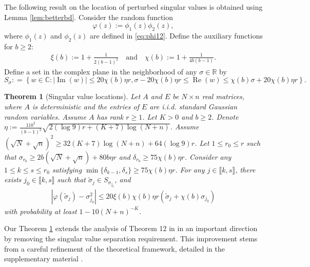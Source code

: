 \documentclass[reqno]{amsart}
\renewcommand\Re{\operatorname{Re}}
\renewcommand\Im{\operatorname{Im}}
\theoremstyle{plain}
\newtheorem{theorem}{Theorem}
\theoremstyle{definition}
\begin{document}
The following result on the location of perturbed singular values is obtained using Lemma \ref{lem:betterbd}. Consider the random function
\begin{equation} \label{eq:def:varphi}
	\varphi(z):=\phi_1(z)\phi_2(z),
\end{equation} 
where $\phi_1(z)$ and $\phi_2(z)$ are defined in \eqref{eq:phi12}. Define the auxiliary functions for $b\ge 2$:
\begin{align*}
\xi(b):= 1+ \frac{1}{2(b-1)^2}\quad \text{and} \quad \chi(b):= 1+ \frac{1}{4b(b-1)}.
\end{align*}
Define a set in the complex plane in the neighborhood of any $\sigma\in \mathbb R$ by
\begin{equation} \label{eq:resolventset}
	S_{\sigma} : = \left\{w \in \mathbb{C} : | \Im(w) | \leq 20 \chi(b) \eta r, \sigma - 20 \chi(b) \eta r \leq \Re(w) \leq \chi(b)\sigma +  20 \chi(b) \eta r \right\}.
\end{equation}

\begin{theorem}[Singular value locations] \label{thm:singularlocation}
Let $A$ and $E$ be $N \times n$ real matrices, where $A$ is deterministic and the entries of $E$ are i.i.d. standard Gaussian random variables. Assume $A$ has rank $r \geq 1$. Let $K>0$ and $b\ge 2$. Denote $\eta:= \frac{11b^2}{(b-1)^2} \sqrt{2(\log 9) r+(K+7) \log (N+n)}$. Assume $(\sqrt N + \sqrt n)^2 \ge 32(K+7)\log(N+n) + 64(\log 9) r$. Let $1\le r_0 \le r$ such that $ \sigma_{r_0} \ge 2b(\sqrt N+ \sqrt{n}) + 80b\eta r$ and $\delta_{r_0}\geq 75\chi(b)\eta r$. Consider any $1 \le k\le s \le r_0$ satisfying $\min\{\delta_{k-1},\delta_s \} \ge 75 \chi(b) \eta r$. For any $j \in \llbracket k, s \rrbracket$, there exists $j_0 \in \llbracket k, s \rrbracket$ such that $\widetilde \sigma_j \in S_{\sigma_{j_0}}$, and
\begin{align}\label{eq:location}
|\varphi(\widetilde{\sigma}_{j}) - \sigma_{j_0}^2| \leq 20\xi(b) \chi(b)\eta r \left(\widetilde{\sigma}_{j}+\chi(b)\sigma_{j_0} \right)
\end{align}
with probability at least $1-10(N+n)^{-K}$.
\end{theorem}
Our Theorem \ref{thm:singularlocation} extends the analysis of Theorem 12 in \cite{OVW22} in an important direction by removing the singular value separation requirement. This improvement stems from a careful refinement of the theoretical framework, detailed in the supplementary material \cite{WangSupp24}.
\end{document}
